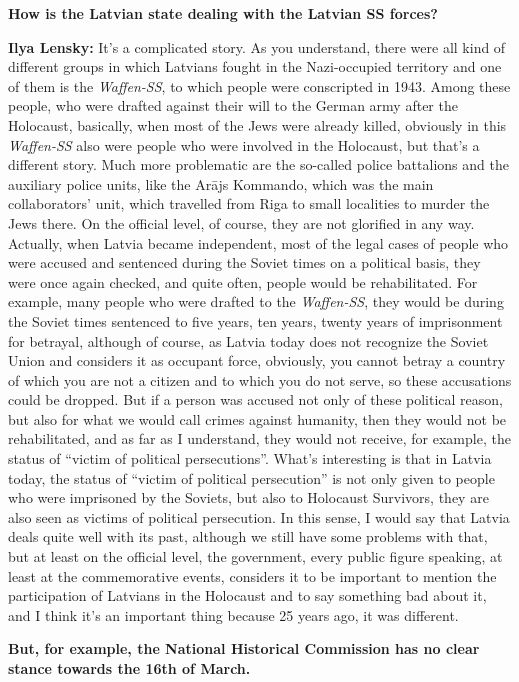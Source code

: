\textbf{How is the Latvian state dealing with the Latvian SS forces?}

\textbf{Ilya Lensky:} It’s a complicated story. As you understand, there were all kind of different groups in which Latvians fought in the Nazi-occupied territory and one of them is the \textit{Waffen-SS}, to which people were conscripted in 1943. Among these people, who were drafted against their will to the German army after the Holocaust, basically, when most of the Jews were already killed, obviously in this \textit{Waffen-SS} also were people who were involved in the Holocaust, but that’s a different story. Much more problematic are the so-called police battalions and the auxiliary police units, like the Arājs Kommando, which was the main collaborators’ unit, which travelled from Riga to small localities to murder the Jews there. On the official level, of course, they are not glorified in any way. Actually, when Latvia became independent, most of the legal cases of people who were accused and sentenced during the Soviet times on a political basis, they were once again checked, and quite often, people would be rehabilitated. For example, many people who were drafted to the \textit{Waffen-SS}, they would be during the Soviet times sentenced to five years, ten years, twenty years of imprisonment for betrayal, although of course, as Latvia today does not recognize the Soviet Union and considers it as occupant force, obviously, you cannot betray a country of which you are not a citizen and to which you do not serve, so these accusations could be dropped. But if a person was accused not only of these political reason, but also for what we would call crimes against humanity, then they would not be rehabilitated, and as far as I understand, they would not receive, for example, the status of ``victim of political persecutions''. What’s interesting is that in Latvia today, the status of ``victim of political persecution'' is not only given to people who were imprisoned by the Soviets, but also to Holocaust Survivors, they are also seen as victims of political persecution. In this sense, I would say that Latvia deals quite well with its past, although we still have some problems with that, but at least on the official level, the government, every public figure speaking, at least at the commemorative events, considers it to be important to mention the participation of Latvians in the Holocaust and to say something bad about it, and I think it's an important thing because 25 years ago, it was different. 

\textbf{But, for example, the National Historical Commission has no clear stance towards the 16th of March.}

